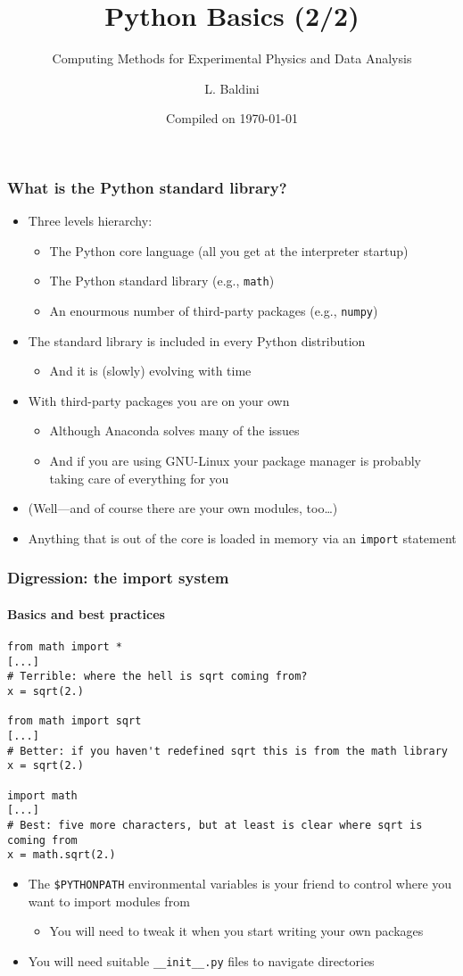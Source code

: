 \documentclass[9pt]{beamer}
\title{Python Basics (2/2)}
\subtitle{Computing Methods for Experimental Physics and Data Analysis}
\date{Compiled on \today}
\author{L. Baldini}
\institute[UNIPI and INFN]{Universit\`a and INFN--Pisa}
\begin{document}
\titleframe

\begin{frame}
  \frametitle{What is the Python standard library?}
  \begin{itemize}
  \item Three levels hierarchy:
    \begin{itemize}
    \item The Python core language (all you get at the interpreter startup)
    \item The Python standard library (e.g., \texttt{math})
    \item An enourmous number of third-party packages (e.g., \texttt{numpy})
    \end{itemize}
  \item The standard library is included in every Python distribution
    \begin{itemize}
    \item And it is (slowly) evolving with time
    \end{itemize}
  \item With third-party packages you are on your own
    \begin{itemize}
    \item Although Anaconda solves many of the issues
    \item And if you are using GNU-Linux your package manager is probably
      taking care of everything for you
    \end{itemize}
  \item (Well---and of course there are your own modules, too\ldots)
  \item \alert{Anything that is out of the core is loaded in memory via an
    \texttt{import} statement}
  \end{itemize}
\end{frame}


\begin{frame}[fragile]
  \frametitle{Digression: the import system}
  \framesubtitle{Basics and best practices}
  \begin{Verbatim}
from math import *
[...]
# Terrible: where the hell is sqrt coming from?
x = sqrt(2.)

from math import sqrt
[...]
# Better: if you haven't redefined sqrt this is from the math library
x = sqrt(2.)

import math
[...]
# Best: five more characters, but at least is clear where sqrt is coming from
x = math.sqrt(2.)
  \end{Verbatim}
  \begin{itemize}
  \item The \texttt{\$PYTHONPATH} environmental variables is your friend
    to control where you want to import modules from
    \begin{itemize}
    \item You will need to tweak it when you start writing your own packages
    \end{itemize}
  \item You will need suitable \texttt{\_\_init\_\_.py} files to navigate
    directories
  \end{itemize}
\end{frame}
\end{document}
